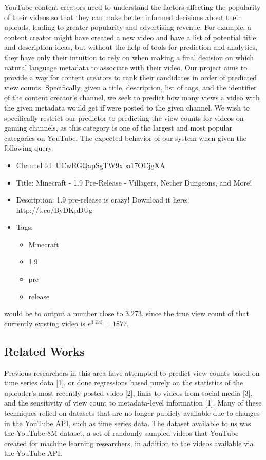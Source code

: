 \documentclass[12pt]{article}
\theoremstyle{definition}
\theoremstyle{remark}
\begin{document}
YouTube content creators need to understand the factors affecting the popularity
of their videos so that they can make better informed decisions about their
uploads, leading to greater popularity and advertising revenue. For example, a
content creator might have created a new video and have a list of potential
title and description ideas, but without the help of tools for prediction and
analytics, they have only their intuition to rely on when making a final
decision on which natural language metadata to associate with their video. Our
project aims to provide a way for content creators to rank their candidates in
order of predicted view counts. Specifically, given a title, description, list
of tags, and the identifier of the content creator's channel, we seek to predict
how many views a video with the given metadata would get if were posted to the
given channel. We wish to specifically restrict our predictor to predicting the
view counts for videos on gaming channels, as this category is one of the
largest and most popular categories on YouTube. The expected behavior of our
system when given the following query:
\begin{itemize}
  \item Channel Id: UCwRGQapSgTW9xba17OCjgXA
  \item Title: Minecraft - 1.9 Pre-Release - Villagers, Nether Dungeons, and More!
  \item Description: 1.9 pre-release is crazy! Download it here: http://t.co/ByDKpDUg
  \item Tags:
    \begin{itemize}
      \item Minecraft
      \item 1.9
      \item pre
      \item release
      \end{itemize}
  \end{itemize}
  would be to output a number close to 3.273, since the true view count of
  that currently existing video is $e^{3.273} = 1877$.

\subsection{Related Works}
Previous researchers in this area have attempted to predict view counts based on
time series data [1], or done regressions based purely on the statistics of the
uploader's most recently posted video [2], links to videos from social media [3], and the
sensitivity of view count to metadata-level information [1]. Many of these
techniques relied on datasets that are no longer publicly available due to
changes in the YouTube API, such as time series data. The dataset available to
us was the YouTube-8M dataset, a set of randomly sampled videos that YouTube
created for machine learning researchers, in addition to the videos available
via the YouTube API.
\end{document}
